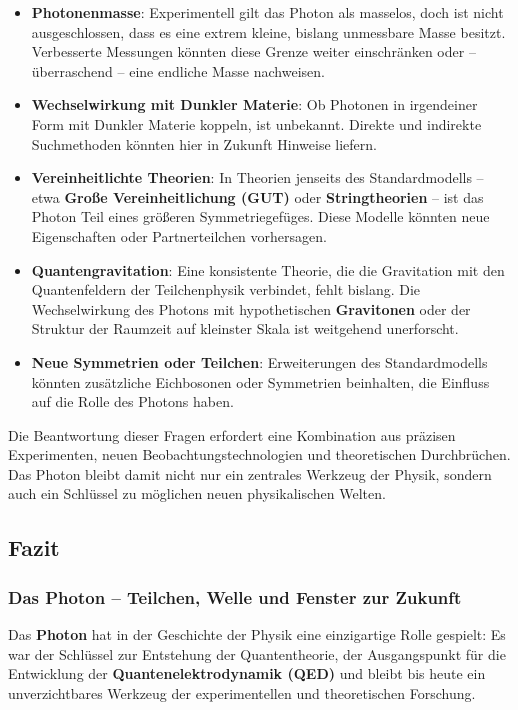 \begin{itemize}
	\item \textbf{Photonenmasse}:  
	Experimentell gilt das Photon als masselos, doch ist nicht ausgeschlossen, dass es eine extrem kleine, bislang unmessbare Masse besitzt.  
	Verbesserte Messungen könnten diese Grenze weiter einschränken oder – überraschend – eine endliche Masse nachweisen.
	
	\item \textbf{Wechselwirkung mit Dunkler Materie}:  
	Ob Photonen in irgendeiner Form mit Dunkler Materie koppeln, ist unbekannt.  
	Direkte und indirekte Suchmethoden könnten hier in Zukunft Hinweise liefern.
	
	\item \textbf{Vereinheitlichte Theorien}:  
	In Theorien jenseits des Standardmodells – etwa \textbf{Große Vereinheitlichung (GUT)} oder \textbf{String\-theorien} – ist das Photon Teil eines größeren Symmetriegefüges.  
	Diese Modelle könnten neue Eigenschaften oder Partnerteilchen vorhersagen.
	
	\item \textbf{Quantengravitation}:  
	Eine konsistente Theorie, die die Gravitation mit den Quantenfeldern der Teilchenphysik verbindet, fehlt bislang.  
	Die Wechselwirkung des Photons mit hypothetischen \textbf{Gravitonen} oder der Struktur der Raumzeit auf kleinster Skala ist weitgehend unerforscht.
	
	\item \textbf{Neue Symmetrien oder Teilchen}:  
	Erweiterungen des Standardmodells könnten zusätzliche Eichbosonen oder Symmetrien beinhalten, die Einfluss auf die Rolle des Photons haben.
\end{itemize}

Die Beantwortung dieser Fragen erfordert eine Kombination aus präzisen Experimenten, neuen Beobachtungstechnologien und theoretischen Durchbrüchen.  
Das Photon bleibt damit nicht nur ein zentrales Werkzeug der Physik, sondern auch ein Schlüssel zu möglichen neuen physikalischen Welten.
\subsection{Fazit}
\subsubsection*{Das Photon – Teilchen, Welle und Fenster zur Zukunft}
Das \textbf{Photon} hat in der Geschichte der Physik eine einzigartige Rolle gespielt:  
Es war der Schlüssel zur Entstehung der Quantentheorie, der Ausgangspunkt für die Entwicklung der \textbf{Quantenelektrodynamik (QED)} und bleibt bis heute ein unverzichtbares Werkzeug der experimentellen und theoretischen Forschung.

